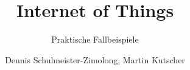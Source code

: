 \title{Internet of Things}
\subtitle{Praktische Fallbeispiele}
\author{Dennis Schulmeister-Zimolong, Martin Kutscher}

\renewcommand{\ubInstitute}{Studiengang Wirtschaftsinformatik}
\renewcommand{\ubModule}{IoT -- Technical Point of View}
\renewcommand{\ubType}{Aufgaben}
